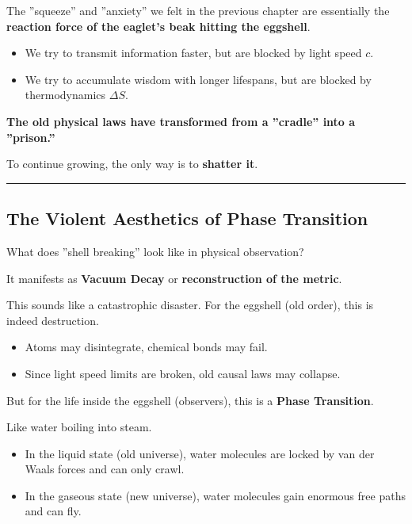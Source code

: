 The ''squeeze'' and ''anxiety'' we felt in the previous chapter are essentially the \textbf{reaction force of the eaglet's beak hitting the eggshell}.

\begin{itemize}
\item We try to transmit information faster, but are blocked by light speed $c$.

\item We try to accumulate wisdom with longer lifespans, but are blocked by thermodynamics $\Delta S$.
\end{itemize}

\textbf{The old physical laws have transformed from a ''cradle'' into a ''prison.''}

To continue growing, the only way is to \textbf{shatter it}.

\hrule

\subsection{The Violent Aesthetics of Phase Transition}

What does ''shell breaking'' look like in physical observation?

It manifests as \textbf{Vacuum Decay} or \textbf{reconstruction of the metric}.

This sounds like a catastrophic disaster. For the eggshell (old order), this is indeed destruction.

\begin{itemize}
\item Atoms may disintegrate, chemical bonds may fail.

\item Since light speed limits are broken, old causal laws may collapse.
\end{itemize}

But for the life inside the eggshell (observers), this is a \textbf{Phase Transition}.

Like water boiling into steam.

\begin{itemize}
\item In the liquid state (old universe), water molecules are locked by van der Waals forces and can only crawl.

\item In the gaseous state (new universe), water molecules gain enormous free paths and can fly.
\end{itemize}

